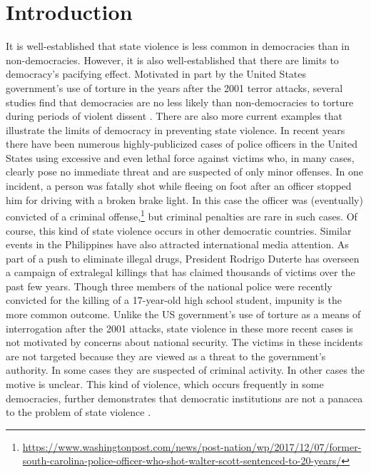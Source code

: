 \documentclass[11pt]{article}
\begin{document}
\section*{Introduction}
It is well-established that state violence is less common in democracies than in non-democracies. However, it is also well-established that there are limits to democracy's pacifying effect. Motivated in part by the United States government's use of torture in the years after the 2001 terror attacks, several studies find that democracies are no less likely than non-democracies to torture during periods of violent dissent \citep{Davenport2007AR,Davenport2007,DavenportMooreArmstrong2007,ConradMoore2010}. There are also more current examples that illustrate the limits of democracy in preventing state violence. In recent years there have been numerous highly-publicized cases of police officers in the United States using excessive and even lethal force against victims who, in many cases, clearly pose no immediate threat and are suspected of only minor offenses. In one incident, a person was fatally shot while fleeing on foot after an officer stopped him for driving with a broken brake light. In this case the officer was (eventually) convicted of a criminal offense,\footnote{\url{https://www.washingtonpost.com/news/post-nation/wp/2017/12/07/former-south-carolina-police-officer-who-shot-walter-scott-sentenced-to-20-years/}} but criminal penalties are rare in such cases. Of course, this kind of state violence occurs in other democratic countries. Similar events in the Philippines have also attracted international media attention. As part of a push to eliminate illegal drugs, President Rodrigo Duterte has overseen a campaign of extralegal killings that has claimed thousands of victims over the past few years. Though three members of the national police were recently convicted for the killing of a 17-year-old high school student, impunity is the more common outcome. Unlike the US government's use of torture as a means of interrogation after the 2001 attacks, state violence in these more recent cases is not motivated by concerns about national security. The victims in these incidents are not targeted because they are viewed as a threat to the government's authority. In some cases they are suspected of criminal activity. In other cases the motive is unclear. This kind of violence, which occurs frequently in some democracies, further demonstrates that democratic institutions are not a panacea to the problem of state violence \citep{Moore2010}.  
\end{document}

